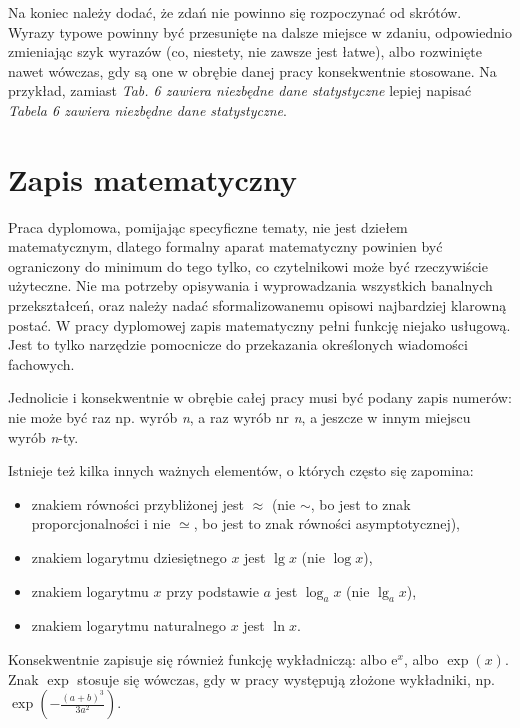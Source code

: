 Na koniec należy dodać, że zdań nie powinno się rozpoczynać od skrótów. Wyrazy typowe powinny być przesunięte na dalsze miejsce w zdaniu, odpowiednio zmieniając szyk wyrazów (co, niestety, nie zawsze jest łatwe), albo rozwinięte \pauza nawet wówczas, gdy są one w obrębie danej pracy konsekwentnie stosowane. Na przykład, zamiast \textit{Tab. 6 zawiera niezbędne dane statystyczne} lepiej napisać \textit{Tabela 6 zawiera niezbędne dane statystyczne}.
\section{Zapis matematyczny}
Praca dyplomowa, pomijając specyficzne tematy, nie jest dziełem matematycznym, dlatego formalny aparat matematyczny powinien być ograniczony do minimum \pauza do tego tylko, co czytelnikowi może być rzeczywiście użyteczne. Nie ma potrzeby opisywania i wyprowadzania wszystkich banalnych przekształceń, oraz należy nadać sformalizowanemu opisowi najbardziej klarowną postać. W pracy dyplomowej zapis matematyczny pełni funkcję niejako usługową. Jest to tylko narzędzie pomocnicze do przekazania określonych wiadomości fachowych.

Jednolicie i konsekwentnie w obrębie całej pracy musi być podany zapis numerów: nie może być raz np. wyrób \textit{n}, a raz wyrób nr \textit{n}, a jeszcze w innym miejscu wyrób \textit{n}-ty.


Istnieje też kilka innych ważnych elementów, o których często się zapomina:
\begin{itemize}
\item znakiem równości przybliżonej jest $\approx$ (nie $\sim$, bo jest to znak proporcjonalności i nie $\simeq$, bo jest to znak równości asymptotycznej),
\item znakiem logarytmu dziesiętnego $x$ jest $\lg x$ (nie $\log x$),
\item znakiem logarytmu $x$ przy podstawie $a$ jest $\log_ax$ (nie $\lg_ax$),
\item znakiem logarytmu naturalnego $x$ jest $\ln x$.
\end{itemize} 
Konsekwentnie zapisuje się również funkcję wykładniczą: albo $\mathrm{e}^x$, albo $\exp (x)$. Znak $\exp$ stosuje się wówczas, gdy w pracy występują złożone wykładniki, np. $\exp \left(-\frac{(a+b)^3}{3a^2}\right )$.

